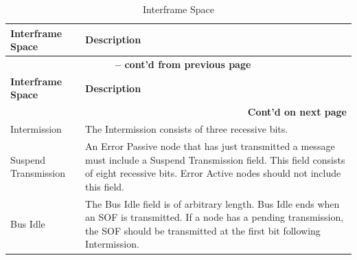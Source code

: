 \begin{longtable}[c]{|p{4cm}|p{11cm}|} 
  \caption{Interframe Space}
  \label{tab:twai-interframe-space} 
  \\\hline
  \rowcolor{lightgray}
  \textbf{Interframe Space} & \textbf{Description}
  \\\hline
  \endfirsthead
  
  \multicolumn{2}{c}{\bfseries \tablename\ \thetable{} -- cont'd from previous page}\\  \hline
  
  \rowcolor{lightgray}
    \textbf{Interframe Space} & \textbf{Description}
  \\\hline
  \endhead
  
  \multicolumn{2}{r}{\textbf{Cont'd on next page}} \\
  \endfoot
  \endlastfoot

    Intermission & The Intermission consists of three recessive bits.
           \\\hline
    Suspend Transmission & An Error Passive node that has just transmitted a message must include a Suspend Transmission field. This field consists of eight recessive bits. Error Active nodes should not include this field.
            \\\hline
    Bus Idle & The Bus Idle field is of arbitrary length. Bus Idle ends when an SOF is transmitted. If a node has a pending transmission, the SOF should be transmitted at the first bit following Intermission.         
            \\\hline
    
\end{longtable}
